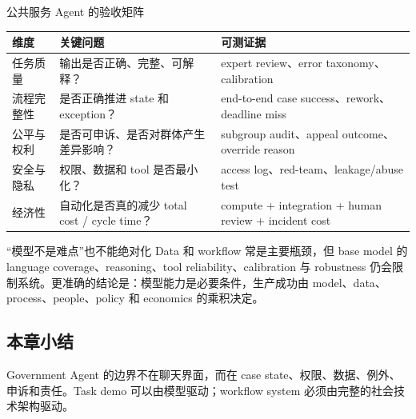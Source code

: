 \begin{importantbox}{公共服务 Agent 的验收矩阵}
\begin{tabularx}{\textwidth}{L{0.18\textwidth}L{0.29\textwidth}X}
\toprule
维度 & 关键问题 & 可测证据 \\
\midrule
任务质量 & 输出是否正确、完整、可解释？ & expert review、error taxonomy、calibration \\
流程完整性 & 是否正确推进 state 和 exception？ & end-to-end case success、rework、deadline miss \\
公平与权利 & 是否可申诉、是否对群体产生差异影响？ & subgroup audit、appeal outcome、override reason \\
安全与隐私 & 权限、数据和 tool 是否最小化？ & access log、red-team、leakage/abuse test \\
经济性 & 自动化是否真的减少 total cost / cycle time？ & compute + integration + human review + incident cost \\
\bottomrule
\end{tabularx}
\end{importantbox}

\begin{warningbox}{“模型不是难点”也不能绝对化}
Data 和 workflow 常是主要瓶颈，但 base model 的 language coverage、reasoning、tool reliability、calibration 与 robustness 仍会限制系统。更准确的结论是：模型能力是必要条件，生产成功由 model、data、process、people、policy 和 economics 的乘积决定。
\end{warningbox}


\subsection{本章小结}

Government Agent 的边界不在聊天界面，而在 case state、权限、数据、例外、申诉和责任。Task demo 可以由模型驱动；workflow system 必须由完整的社会技术架构驱动。


